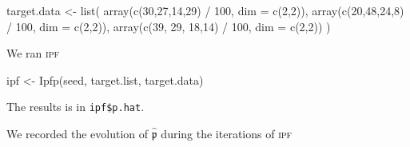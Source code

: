 \documentclass[
]{article}
\newenvironment{Shaded}{\begin{snugshade}}{\end{snugshade}}
\newcommand{\AttributeTok}[1]{\textcolor[rgb]{0.77,0.63,0.00}{#1}}
\newcommand{\DecValTok}[1]{\textcolor[rgb]{0.00,0.00,0.81}{#1}}
\newcommand{\FunctionTok}[1]{\textcolor[rgb]{0.00,0.00,0.00}{#1}}
\newcommand{\NormalTok}[1]{#1}
\newcommand{\OtherTok}[1]{\textcolor[rgb]{0.56,0.35,0.01}{#1}}
\newcommand{\SpecialCharTok}[1]{\textcolor[rgb]{0.00,0.00,0.00}{#1}}
\newcommand{\prob}[1]{\mathfrak{#1}}
\newcommand{\maxentP}{\hat{\prob p}}
\newcommand{\ipf}{\textsc{ipf}~}
\begin{document}
\begin{Shaded}
\begin{Highlighting}[]
\NormalTok{target.data }\OtherTok{\textless{}{-}} \FunctionTok{list}\NormalTok{(}
  \FunctionTok{array}\NormalTok{(}\FunctionTok{c}\NormalTok{(}\DecValTok{30}\NormalTok{,}\DecValTok{27}\NormalTok{,}\DecValTok{14}\NormalTok{,}\DecValTok{29}\NormalTok{) }\SpecialCharTok{/} \DecValTok{100}\NormalTok{, }\AttributeTok{dim =} \FunctionTok{c}\NormalTok{(}\DecValTok{2}\NormalTok{,}\DecValTok{2}\NormalTok{)),}
  \FunctionTok{array}\NormalTok{(}\FunctionTok{c}\NormalTok{(}\DecValTok{20}\NormalTok{,}\DecValTok{48}\NormalTok{,}\DecValTok{24}\NormalTok{,}\DecValTok{8}\NormalTok{) }\SpecialCharTok{/} \DecValTok{100}\NormalTok{, }\AttributeTok{dim =} \FunctionTok{c}\NormalTok{(}\DecValTok{2}\NormalTok{,}\DecValTok{2}\NormalTok{)),}
  \FunctionTok{array}\NormalTok{(}\FunctionTok{c}\NormalTok{(}\DecValTok{39}\NormalTok{, }\DecValTok{29}\NormalTok{, }\DecValTok{18}\NormalTok{,}\DecValTok{14}\NormalTok{) }\SpecialCharTok{/} \DecValTok{100}\NormalTok{, }\AttributeTok{dim =} \FunctionTok{c}\NormalTok{(}\DecValTok{2}\NormalTok{,}\DecValTok{2}\NormalTok{))}
\NormalTok{)}
\end{Highlighting}
\end{Shaded}

We ran \ipf 

\begin{Shaded}
\begin{Highlighting}[]
\NormalTok{ipf }\OtherTok{\textless{}{-}} \FunctionTok{Ipfp}\NormalTok{(seed, target.list, target.data)}
\end{Highlighting}
\end{Shaded}

The results is in \texttt{ipf\$p.hat}.

We recorded the evolution of \(\maxentP\) during the iterations of \ipf
\end{document}
